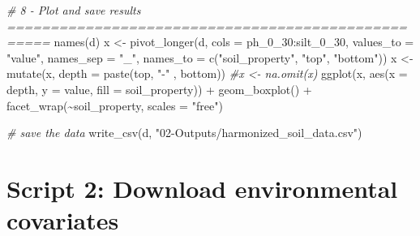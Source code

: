 \documentclass[
  10pt,
  b5paper,
  oneside]{book}
\newenvironment{Shaded}{\begin{snugshade}}{\end{snugshade}}
\newcommand{\AttributeTok}[1]{\textcolor[rgb]{0.77,0.63,0.00}{#1}}
\newcommand{\CommentTok}[1]{\textcolor[rgb]{0.56,0.35,0.01}{\textit{#1}}}
\newcommand{\FunctionTok}[1]{\textcolor[rgb]{0.00,0.00,0.00}{#1}}
\newcommand{\NormalTok}[1]{#1}
\newcommand{\OtherTok}[1]{\textcolor[rgb]{0.56,0.35,0.01}{#1}}
\newcommand{\SpecialCharTok}[1]{\textcolor[rgb]{0.00,0.00,0.00}{#1}}
\newcommand{\StringTok}[1]{\textcolor[rgb]{0.31,0.60,0.02}{#1}}
\begin{document}
\begin{Shaded}
\begin{Highlighting}[]
\CommentTok{\# 8 {-} Plot  and save results ===================================================}
\FunctionTok{names}\NormalTok{(d)}
\NormalTok{x }\OtherTok{\textless{}{-}} \FunctionTok{pivot\_longer}\NormalTok{(d, }\AttributeTok{cols =}\NormalTok{ ph\_0\_30}\SpecialCharTok{:}\NormalTok{silt\_0\_30, }\AttributeTok{values\_to =} \StringTok{"value"}\NormalTok{,}
                  \AttributeTok{names\_sep =} \StringTok{"\_"}\NormalTok{, }
                  \AttributeTok{names\_to =} \FunctionTok{c}\NormalTok{(}\StringTok{"soil\_property"}\NormalTok{, }\StringTok{"top"}\NormalTok{, }\StringTok{"bottom"}\NormalTok{))}
\NormalTok{x }\OtherTok{\textless{}{-}} \FunctionTok{mutate}\NormalTok{(x, }\AttributeTok{depth =} \FunctionTok{paste}\NormalTok{(top, }\StringTok{"{-}"}\NormalTok{ , bottom))}
\CommentTok{\#x \textless{}{-} na.omit(x)}
\FunctionTok{ggplot}\NormalTok{(x, }\FunctionTok{aes}\NormalTok{(}\AttributeTok{x =}\NormalTok{ depth, }\AttributeTok{y =}\NormalTok{ value, }\AttributeTok{fill =}\NormalTok{ soil\_property)) }\SpecialCharTok{+}
  \FunctionTok{geom\_boxplot}\NormalTok{() }\SpecialCharTok{+} 
  \FunctionTok{facet\_wrap}\NormalTok{(}\SpecialCharTok{\textasciitilde{}}\NormalTok{soil\_property, }\AttributeTok{scales =} \StringTok{"free"}\NormalTok{)}

\CommentTok{\# save the data}
\FunctionTok{write\_csv}\NormalTok{(d, }\StringTok{"02{-}Outputs/harmonized\_soil\_data.csv"}\NormalTok{)}
\end{Highlighting}
\end{Shaded}

\hypertarget{script-2-download-environmental-covariates}{%
\section*{Script 2: Download environmental covariates}\label{script-2-download-environmental-covariates}}
\end{document}
